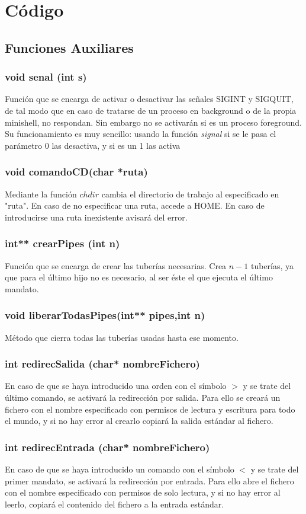 \chapter{Código}
\section{Funciones Auxiliares}
\subsection{void senal (int s)}
Función que se encarga de activar o desactivar las señales SIGINT y SIGQUIT, de tal modo que en caso de tratarse de un proceso en background o de la propia minishell, no respondan. Sin embargo no se activarán si es un proceso foreground.\\
Su funcionamiento es muy sencillo: usando la función \textit{signal} si se le pasa el parámetro 0 las desactiva, y si es un 1 las activa
\subsection{void comandoCD(char *ruta)}
Mediante la función $chdir$ cambia el directorio de trabajo al especificado en "ruta". En caso de no especificar una ruta, accede a HOME. En caso de introducirse una ruta inexistente avisará del error.
\subsection{int** crearPipes (int n)}
Función que se encarga de crear las tuberías necesarias. Crea $n-1$ tuberías, ya que para el último hijo no es necesario, al ser éste el que ejecuta el último mandato.
\subsection{void liberarTodasPipes(int** pipes,int n)}
Método que cierra todas las tuberías usadas hasta ese momento.
\subsection{int redirecSalida (char* nombreFichero)}
En caso de que se haya introducido una orden con el símbolo $>$ y se trate del último comando, se activará la redirección por salida. Para ello se creará un fichero con el nombre especificado con permisos de lectura y escritura para todo el mundo, y si no hay error al crearlo copiará la salida estándar al fichero.
\subsection{int redirecEntrada (char* nombreFichero)}
En caso de que se haya introducido un comando con el símbolo $<$ y se trate del primer mandato, se activará la redirección por entrada. Para ello abre el fichero con el nombre especificado con permisos de solo lectura, y si no hay error al leerlo, copiará el contenido del fichero a la entrada estándar.

